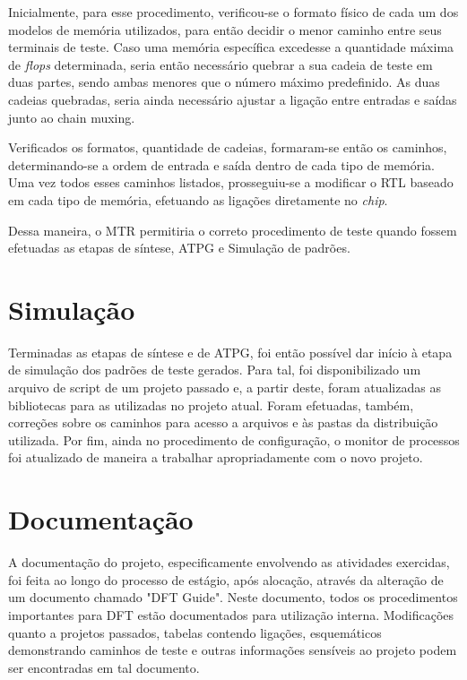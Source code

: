 \documentclass[
	12pt,				%
    oneside,			%
	a4paper,			%
	english,			%
	french,				%
	spanish,			%
	brazil				%
	]{abntex2}
\begin{document}
Inicialmente, para esse procedimento, verificou-se o formato físico de cada um dos modelos de memória utilizados, para então decidir o menor caminho entre seus terminais de teste. Caso uma memória específica excedesse a quantidade máxima de \textit{flops} determinada, seria então necessário quebrar a sua cadeia de teste em duas partes, sendo ambas menores que o número máximo predefinido. As duas cadeias quebradas, seria ainda necessário ajustar a ligação entre entradas e saídas junto ao chain muxing.

Verificados os formatos, quantidade de cadeias, formaram-se então os caminhos, determinando-se a ordem de entrada e saída dentro de cada tipo de memória. Uma vez todos esses caminhos listados, prosseguiu-se a modificar o RTL baseado em cada tipo de memória, efetuando as ligações diretamente no \textit{chip}.

Dessa maneira, o MTR permitiria o correto procedimento de teste quando fossem efetuadas as etapas de síntese, ATPG e Simulação de padrões.

\section{Simulação}

Terminadas as etapas de síntese e de ATPG, foi então possível dar início à etapa de simulação dos padrões de teste gerados. Para tal, foi disponibilizado um arquivo de script de um projeto passado e, a partir deste, foram atualizadas as bibliotecas para as utilizadas no projeto atual. Foram efetuadas, também, correções sobre os caminhos para acesso a arquivos e às pastas da distribuição utilizada. Por fim, ainda no procedimento de configuração, o monitor de processos foi atualizado de maneira a trabalhar apropriadamente com o novo projeto.

\section{Documentação}

A documentação do projeto, especificamente envolvendo as atividades exercidas, foi feita ao longo do processo de estágio, após alocação, através da alteração de um documento chamado "DFT Guide". Neste documento, todos os procedimentos importantes para DFT estão documentados para utilização interna. Modificações quanto a projetos passados, tabelas contendo ligações, esquemáticos demonstrando caminhos de teste e outras informações sensíveis ao projeto podem ser encontradas em tal documento.
\end{document}
